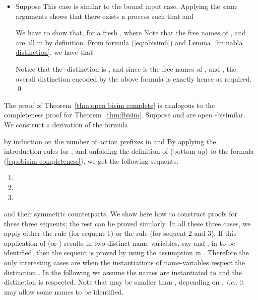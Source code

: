 \documentclass{acmtrans2m}
\newcommand{\ie}{{\em i.e.}}
\begin{document}
\begin{itemize}
\item Suppose  This case is similar to the bound input
case. Applying the same arguments shows that there exists a process 
such that  and 

We have to show that, for a fresh , 
 where 
Note that the free names of ,  and  are all in  by definition.
From formula (\ref{eq:obisim6}) and Lemma~\ref{lm:nabla distinction}, we have that

Notice that the -distinction is 
, and since  is the free names of , 
and , the overall distinction encoded by the above formula is exactly
 hence  as required. \qed
\end{itemize}


The proof of Theorem~\ref{thm:open bisim complete}
is analogous to the completeness proof for Theorem~\ref{thm:lbisim}.
Suppose  and  are open -bisimilar. We construct a derivation of
the formula 

by induction on the number of action prefixes in  and  
By applying the introduction rules
for ,  and unfolding the definition of  (bottom up) 
to the formula (\ref{eq:obisim-completeness}), we get the following sequents:
\begin{enumerate}
\item 
\item 
\item 
\end{enumerate}
and their symmetric counterparts. 
We show here how to construct proofs for these three sequents; the rest can be
proved similarly. In all these three cases, we apply either the  rule (for sequent 1) 
or the  rule (for sequent 2 and 3). If this application of  (or )
results in two distinct name-variables, say  and , in  to be identified, then
the sequent is proved by using the assumption  in . Therefore the only 
interesting cases are when the instantiations of name-variables  respect the
distinction . 
In the following we assume the names  are instantiated to 
 and the distinction  is respected. 
Note that  may be smaller than , depending on , \ie, it may allow
some names to be identified. 
\end{document}
